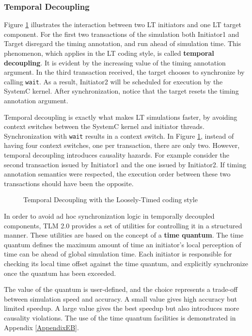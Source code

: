 \documentclass[11pt]{article}
\begin{document}
\subsubsection{Temporal Decoupling}
\label{sec:org2cca2a8}
Figure \ref{fig:temporal_decoupling} illustrates the interaction between two LT initiators and one LT target component.
For the first two transactions of the simulation both Initiator1 and Target disregard the timing annotation, and run ahead of simulation time.
This phenomenon, which applies in the LT coding style, is called \textbf{temporal decoupling}.
It is evident by the increasing value of the timing annotation argument.
In the third transaction received, the target chooses to synchronize by calling \texttt{wait}.
As a result, Initiator2 will be scheduled for execution by the SystemC kernel.
After synchronization, notice that the target resets the timing annotation argument.

Temporal decoupling is exactly what makes LT simulations faster, by avoiding context switches between the SystemC kernel and initiator threads.
Synchronization with \texttt{wait} results in a context switch. 
In Figure \ref{fig:temporal_decoupling}, instead of having four context switches, one per transaction, there are only two.
However, temporal decoupling introduces causality hazards.
For example consider the second transaction issued by Initiator1 and the one issued by Initiator2.
If timing annotation semantics were respected, the execution order between these two transactions should have been the opposite.

\begin{figure}[htpb]
\centering

\caption{Temporal Decoupling with the Loosely-Timed coding style} 
\label{fig:temporal_decoupling}
\end{figure}

In order to avoid ad hoc synchronization logic in temporally decoupled components, TLM 2.0 provides a set of utilities for controlling it in a structured manner. 
These utilities are based on the concept of a \textbf{time quantum}.
The time quantum defines the maximum amount of time an initiator's local perception of time can be ahead of global simulation time.
Each initiator is responsible for checking its local time offset against the time quantum, and explicitly synchronize once the quantum has been exceeded.

The value of the quantum is user-defined, and the choice represents a trade-off between simulation speed and accuracy.
A small value gives high accuracy but limited speedup.
A large value gives the best speedup but also introduces more causality violations.
The use of the time quantum facilities is demonstrated in Appendix \ref{AppendixEB}.
\end{document}
